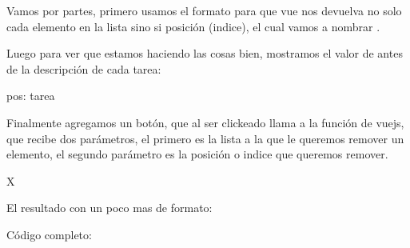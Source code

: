 \documentclass[letterpaper,10pt,spanish]{sphinxmanual}
\begin{document}
Vamos por partes, primero usamos el formato  para que vue
nos devuelva no solo cada elemento en la lista sino si posición (indice), el cual
vamos a nombrar .

%
\begin{sphinxVerbatim}[commandchars=\\\{\}]
 
\end{sphinxVerbatim}

Luego para ver que estamos haciendo las cosas bien, mostramos el valor de 
antes de la descripción de cada tarea:

%
\begin{sphinxVerbatim}[commandchars=\\\{\}]
\PYGZob{}\PYGZob{}pos\PYGZcb{}\PYGZcb{}: \PYGZob{}\PYGZob{}tarea\PYGZcb{}\PYGZcb{}
\end{sphinxVerbatim}

Finalmente agregamos un botón, que al ser clickeado llama a la función
 de vuejs, que recibe dos parámetros, el primero es la lista a la que
le queremos remover un elemento, el segundo parámetro es la posición o indice
que queremos remover.

%
\begin{sphinxVerbatim}[commandchars=\\\{\}]
  X
\end{sphinxVerbatim}

El resultado con un poco mas de formato:



Código completo:
\end{document}
